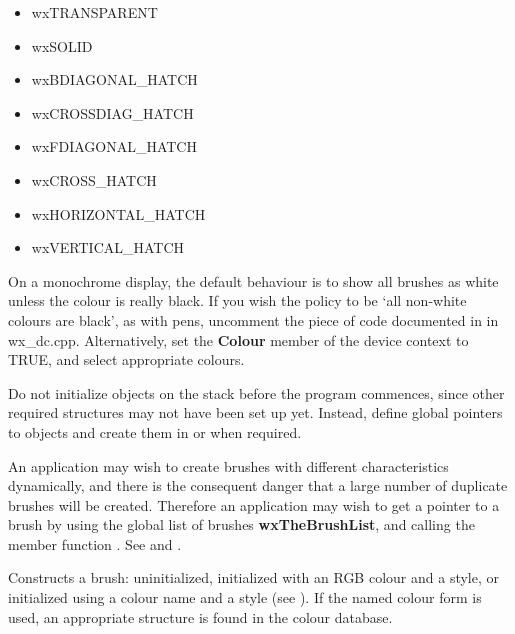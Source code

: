 \begin{itemize}\itemsep=0pt
\item wxTRANSPARENT
\item wxSOLID
\item wxBDIAGONAL\_HATCH
\item wxCROSSDIAG\_HATCH
\item wxFDIAGONAL\_HATCH
\item wxCROSS\_HATCH
\item wxHORIZONTAL\_HATCH
\item wxVERTICAL\_HATCH
\end{itemize}

On a monochrome display, the default behaviour is to show
all brushes as white unless the colour is really black. If you wish the
policy to be `all non-white colours are black', as with pens, uncomment
the piece of code documented in  in wx\_dc.cpp.
Alternatively, set the {\bf Colour} member of the device context to
TRUE, and select appropriate colours.

Do not initialize objects on the stack before the program commences,
since other required structures may not have been set up yet. Instead,
define global pointers to objects and create them in  or
when required.

An application may wish to create brushes with different
characteristics dynamically, and there is the consequent danger that a
large number of duplicate brushes will be created. Therefore an
application may wish to get a pointer to a brush by using the global
list of brushes {\bf wxTheBrushList}, and calling the member function
. See  and .





Constructs a brush: uninitialized, initialized with an RGB colour and
a style, or initialized using a colour name and a style (see ).
If the named colour form is used, an appropriate  structure is found
in the colour database.


